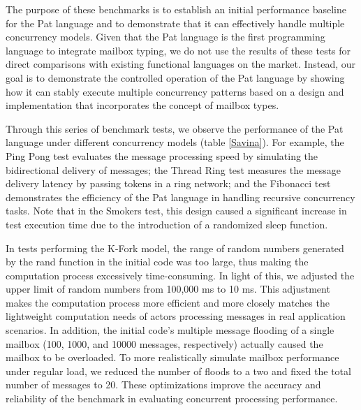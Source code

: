 \documentclass{l4proj}
\begin{document}
The purpose of these benchmarks is to establish an initial performance baseline for the Pat language and to demonstrate that it can effectively handle multiple concurrency models. Given that the Pat language is the first programming language to integrate mailbox typing, we do not use the results of these tests for direct comparisons with existing functional languages on the market. Instead, our goal is to demonstrate the controlled operation of the Pat language by showing how it can stably execute multiple concurrency patterns based on a design and implementation that incorporates the concept of mailbox types.

Through this series of benchmark tests, we observe the performance of the Pat language under different concurrency models (table \ref{Savina}). For example, the Ping Pong test evaluates the message processing speed by simulating the bidirectional delivery of messages; the Thread Ring test measures the message delivery latency by passing tokens in a ring network; and the Fibonacci test demonstrates the efficiency of the Pat language in handling recursive concurrency tasks. Note that in the Smokers test, this design caused a significant increase in test execution time due to the introduction of a randomized sleep function.

In tests performing the K-Fork model, the range of random numbers generated by the rand function in the initial code was too large, thus making the computation process excessively time-consuming. In light of this, we adjusted the upper limit of random numbers from 100,000 ms to 10 ms. This adjustment makes the computation process more efficient and more closely matches the lightweight computation needs of actors processing messages in real application scenarios. In addition, the initial code's multiple message flooding of a single mailbox (100, 1000, and 10000 messages, respectively) actually caused the mailbox to be overloaded. To more realistically simulate mailbox performance under regular load, we reduced the number of floods to a two and fixed the total number of messages to 20. These optimizations improve the accuracy and reliability of the benchmark in evaluating concurrent processing performance.
\end{document}
